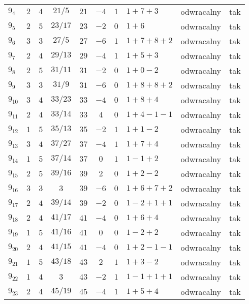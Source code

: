 \begin{longtable}{lccccccllc}
$9_{4}$    & $2$   & $4$ & $21/5$ & $21$  & $-4$ & $1$ & $1+7+3$       & odwracalny & tak \\
$9_{5}$    & $2$   & $5$ & $23/17$ & $23$  & $-2$ & $0$ & $1+6$         & odwracalny & tak \\
$9_{6}$    & $3$   & $3$ & $27/5$ & $27$  & $-6$ & $1$ & $1+7+8+2$     & odwracalny & tak \\
$9_{7}$    & $2$   & $4$ & $29/13$ & $29$  & $-4$ & $1$ & $1+5+3$       & odwracalny & tak \\
$9_{8}$    & $2$   & $5$ & $31/11$ & $31$  & $-2$ & $0$ & $1+0-2$       & odwracalny & tak \\
$9_{9}$    & $3$   & $3$ & $31/9$ & $31$  & $-6$ & $0$ & $1+8+8+2$     & odwracalny & tak \\
$9_{10}$   & $3$   & $4$ & $33/23$ & $33$  & $-4$ & $0$ & $1+8+4$       & odwracalny & tak \\
$9_{11}$   & $2$   & $4$ & $33/14$ & $33$  & $4$  & $0$ & $1+4-1-1$     & odwracalny & tak \\
$9_{12}$   & $1$   & $5$ & $35/13$ & $35$  & $-2$ & $1$ & $1+1-2$       & odwracalny & tak \\
$9_{13}$   & $3$   & $4$ & $37/27$ & $37$  & $-4$ & $1$ & $1+7+4$       & odwracalny & tak \\
$9_{14}$   & $1$   & $5$ & $37/14$ & $37$  & $0$  & $1$ & $1-1+2$       & odwracalny & tak \\
$9_{15}$   & $2$   & $5$ & $39/16$ & $39$  & $2$  & $0$ & $1+2-2$       & odwracalny & tak \\
$9_{16}$   & $3$   & $3$ & $3$ & $39$  & $-6$ & $0$ & $1+6+7+2$     & odwracalny & tak \\
$9_{17}$   & $2$   & $4$ & $39/14$ & $39$  & $-2$ & $0$ & $1-2+1+1$     & odwracalny & tak \\
$9_{18}$   & $2$   & $4$ & $41/17$ & $41$  & $-4$ & $0$ & $1+6+4$       & odwracalny & tak \\
$9_{19}$   & $1$   & $5$ & $41/16$ & $41$  & $0$  & $0$ & $1-2+2$       & odwracalny & tak \\
$9_{20}$   & $2$   & $4$ & $41/15$ & $41$  & $-4$ & $0$ & $1+2-1-1$     & odwracalny & tak \\
$9_{21}$   & $1$   & $5$ & $43/18$ & $43$  & $2$  & $1$ & $1+3-2$       & odwracalny & tak \\
$9_{22}$   & $1$   & $4$ & $3$ & $43$  & $-2$ & $1$ & $1-1+1+1$     & odwracalny & tak \\
$9_{23}$   & $2$   & $4$ & $45/19$ & $45$  & $-4$ & $1$ & $1+5+4$       & odwracalny & tak \\

\end{longtable}
